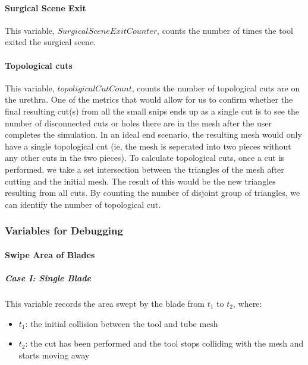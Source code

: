 \paragraph{Surgical Scene Exit}\label{para:data_surgical_scene_exit}

This variable, $SurgicalSceneExitCounter$, counts the number of times the tool exited the surgical scene.

\paragraph{Topological cuts}\label{para:data_counters_topological_cuts}

This variable, $topoligicalCutCount$, counts the number of topological cuts are on the urethra. One of the metrics that would allow for us to confirm whether the final resulting cut(s) from all the small snips ends up as a single cut is to see the number of disconnected cuts or holes there are in the mesh after the user completes the simulation. In an ideal end scenario, the resulting mesh would only have a single topological cut (ie, the mesh is seperated into two pieces without any other cuts in the two pieces). To calculate topological cuts, once a cut is performed, we take a set intersection between the triangles of the mesh after cutting and the initial mesh. The result of this would be the new triangles resulting from all cuts. By counting the number of disjoint group of triangles, we can identify the number of topological cut.

\subsubsection{Variables for Debugging}

\paragraph{Swipe Area of Blades}\label{para:data_swipe_area_of_blades}

\subparagraph{Case I: Single Blade}

This variable records the area swept by the blade from $t_1$ to $t_2$, where:

\begin{itemize}
  \item $t_1$: the initial collision between the tool and tube mesh
  \item $t_2$: the cut has been performed and the tool stops colliding with the mesh and starts moving away
\end{itemize}


